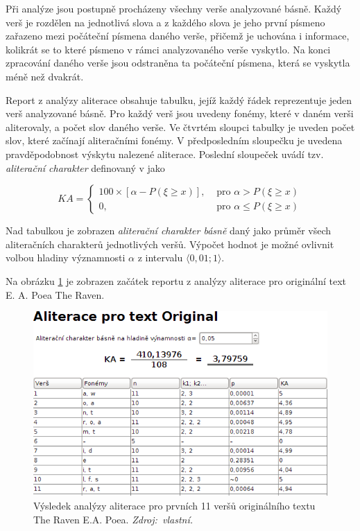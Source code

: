 \documentclass[dp.tex]{subfiles}
\begin{document}
Při analýze jsou postupně procházeny všechny verše analyzované básně. Každý verš je rozdělen na jednotlivá slova a z každého slova je jeho první písmeno zařazeno mezi počáteční písmena daného verše, přičemž je uchována i informace, kolikrát se to které písmeno v rámci analyzovaného verše vyskytlo. Na konci zpracování daného verše jsou odstraněna ta počáteční písmena, která se vyskytla méně než dvakrát.

Report z analýzy aliterace obsahuje tabulku, jejíž každý řádek reprezentuje jeden verš analyzované básně. Pro každý verš jsou uvedeny fonémy, které v daném verši aliterovaly, a počet slov daného verše. Ve čtvrtém sloupci tabulky je uveden počet slov, které začínají aliteračními fonémy. V předposledním sloupečku je uvedena pravděpodobnost výskytu nalezené aliterace. Poslední sloupeček uvádí tzv. \textit{aliterační charakter} definovaný v \cite[str.~60]{Wimmer2003} jako

\[{K\!A} = \left\{
  \begin{array}{lr}
    100 \times [ \alpha - P( \xi \geq x)],& \text{ pro } \alpha >  P( \xi \geq x)\\
    0,& \text{ pro } \alpha \leq  P( \xi \geq x)
  \end{array}
\right.
\]

Nad tabulkou je zobrazen \textit{aliterační charakter básně} daný jako průměr všech aliteračních charakterů jednotlivých veršů. Výpočet hodnot \KA je možné ovlivnit volbou hladiny významnosti $\alpha$ z intervalu $\langle 0{,}01; 1 \rangle$.

Na obrázku \ref{fig:alliteration} je zobrazen začátek reportu z analýzy aliterace pro originální text E. A. Poea The Raven.\newpage

\begin{figure}[H]
	\centering
	\includegraphics[max width=\textwidth,keepaspectratio=true]{imgs-70-prakticka/alliteration}
	\caption[Výsledek analýzy aliterace pro prvních 11 veršů originálního textu The Raven E.A. Poea]{Výsledek analýzy aliterace pro prvních 11 veršů originálního textu The Raven E.A. Poea. \textit{Zdroj:~vlastní.}}
	\label{fig:alliteration}
\end{figure}
\end{document}
